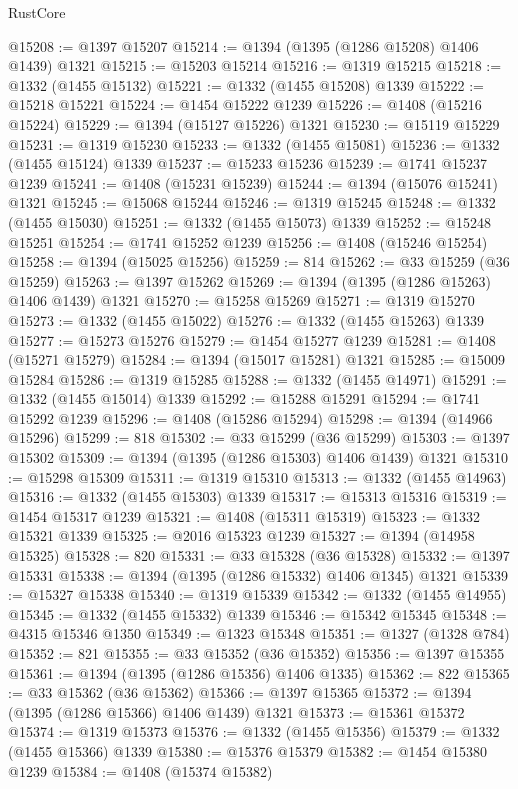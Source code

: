 \begin{lexlean}{RustCore}
\begin{coremodule}
@15208 := @1397 @15207
@15214 := @1394 (@1395 (@1286 @15208) @1406 @1439) @1321
@15215 := @15203 @15214
@15216 := @1319 @15215
@15218 := @1332 (@1455 @15132)
@15221 := @1332 (@1455 @15208) @1339
@15222 := @15218 @15221
@15224 := @1454 @15222 @1239
@15226 := @1408 (@15216 @15224)
@15229 := @1394 (@15127 @15226) @1321
@15230 := @15119 @15229
@15231 := @1319 @15230
@15233 := @1332 (@1455 @15081)
@15236 := @1332 (@1455 @15124) @1339
@15237 := @15233 @15236
@15239 := @1741 @15237 @1239
@15241 := @1408 (@15231 @15239)
@15244 := @1394 (@15076 @15241) @1321
@15245 := @15068 @15244
@15246 := @1319 @15245
@15248 := @1332 (@1455 @15030)
@15251 := @1332 (@1455 @15073) @1339
@15252 := @15248 @15251
@15254 := @1741 @15252 @1239
@15256 := @1408 (@15246 @15254)
@15258 := @1394 (@15025 @15256)
@15259 := 814
@15262 := @33 @15259 (@36 @15259)
@15263 := @1397 @15262
@15269 := @1394 (@1395 (@1286 @15263) @1406 @1439) @1321
@15270 := @15258 @15269
@15271 := @1319 @15270
@15273 := @1332 (@1455 @15022)
@15276 := @1332 (@1455 @15263) @1339
@15277 := @15273 @15276
@15279 := @1454 @15277 @1239
@15281 := @1408 (@15271 @15279)
@15284 := @1394 (@15017 @15281) @1321
@15285 := @15009 @15284
@15286 := @1319 @15285
@15288 := @1332 (@1455 @14971)
@15291 := @1332 (@1455 @15014) @1339
@15292 := @15288 @15291
@15294 := @1741 @15292 @1239
@15296 := @1408 (@15286 @15294)
@15298 := @1394 (@14966 @15296)
@15299 := 818
@15302 := @33 @15299 (@36 @15299)
@15303 := @1397 @15302
@15309 := @1394 (@1395 (@1286 @15303) @1406 @1439) @1321
@15310 := @15298 @15309
@15311 := @1319 @15310
@15313 := @1332 (@1455 @14963)
@15316 := @1332 (@1455 @15303) @1339
@15317 := @15313 @15316
@15319 := @1454 @15317 @1239
@15321 := @1408 (@15311 @15319)
@15323 := @1332 @15321 @1339
@15325 := @2016 @15323 @1239
@15327 := @1394 (@14958 @15325)
@15328 := 820
@15331 := @33 @15328 (@36 @15328)
@15332 := @1397 @15331
@15338 := @1394 (@1395 (@1286 @15332) @1406 @1345) @1321
@15339 := @15327 @15338
@15340 := @1319 @15339
@15342 := @1332 (@1455 @14955)
@15345 := @1332 (@1455 @15332) @1339
@15346 := @15342 @15345
@15348 := @4315 @15346 @1350
@15349 := @1323 @15348
@15351 := @1327 (@1328 @784)
@15352 := 821
@15355 := @33 @15352 (@36 @15352)
@15356 := @1397 @15355
@15361 := @1394 (@1395 (@1286 @15356) @1406 @1335)
@15362 := 822
@15365 := @33 @15362 (@36 @15362)
@15366 := @1397 @15365
@15372 := @1394 (@1395 (@1286 @15366) @1406 @1439) @1321
@15373 := @15361 @15372
@15374 := @1319 @15373
@15376 := @1332 (@1455 @15356)
@15379 := @1332 (@1455 @15366) @1339
@15380 := @15376 @15379
@15382 := @1454 @15380 @1239
@15384 := @1408 (@15374 @15382)

\end{coremodule}
\end{lexlean}
